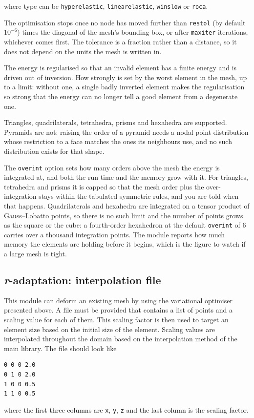 where type can be \texttt{hyperelastic}, \texttt{linearelastic},
\texttt{winslow} or \texttt{roca}.

The optimisation stops once no node has moved further than
\texttt{restol} (by default $10^{-6}$) times the diagonal of the mesh's
bounding box, or after \texttt{maxiter} iterations, whichever comes
first. The tolerance is a fraction rather than a distance, so it does not
depend on the units the mesh is written in.

The energy is regularised so that an invalid element has a finite energy and
is driven out of inversion. How strongly is set by the worst element in the
mesh, up to a limit: without one, a single badly inverted element makes the
regularisation so strong that the energy can no longer tell a good element
from a degenerate one.

Triangles, quadrilaterals, tetrahedra, prisms and hexahedra are supported.
Pyramids are not: raising the order of a pyramid needs a nodal point
distribution whose restriction to a face matches the ones its neighbours
use, and no such distribution exists for that shape.

The \texttt{overint} option sets how many orders above the mesh the energy
is integrated at, and both the run time and the memory grow with it. For
triangles, tetrahedra and prisms it is capped so that the mesh order plus
the over-integration stays within the tabulated symmetric rules, and you are
told when that happens. Quadrilaterals and hexahedra are integrated on a
tensor product of Gauss--Lobatto points, so there is no such limit and the
number of points grows as the square or the cube: a fourth-order hexahedron
at the default \texttt{overint} of 6 carries over a thousand integration
points. The module reports how much memory the elements are holding before
it begins, which is the figure to watch if a large mesh is tight.

\subsection{\emph{r}-adaptation: interpolation file}
This module can deform an existing mesh by using the variational optimiser
presented above. A file must be provided that contains a list of points
and a scaling value for each of them. This scaling factor is then used to
target an element size based on the initial size of the element. Scaling
values are interpolated throughout the domain based on the interpolation
method of the main library. The file should look like
\begin{lstlisting}
0 0 0 2.0
0 1 0 2.0
1 0 0 0.5
1 1 0 0.5
\end{lstlisting}
where the first three columns are \texttt{x}, \texttt{y}, \texttt{z} and
the last column is the scaling factor.

